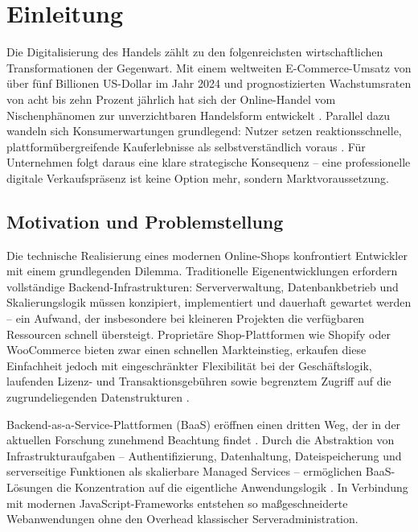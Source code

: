 \chapter{Einleitung}
\label{ch:einleitung}

Die Digitalisierung des Handels zählt zu den folgenreichsten wirtschaftlichen Transformationen der Gegenwart. Mit einem weltweiten E-Commerce-Umsatz von über fünf Billionen US-Dollar im Jahr 2024 und prognostizierten Wachstumsraten von acht bis zehn Prozent jährlich hat sich der Online-Handel vom Nischenphänomen zur unverzichtbaren Handelsform entwickelt \cite{heinemann2024, statista2025}. Parallel dazu wandeln sich Konsumerwartungen grundlegend: Nutzer setzen reaktionsschnelle, plattformübergreifende Kauferlebnisse als selbstverständlich voraus \cite{sagar2024}. Für Unternehmen folgt daraus eine klare strategische Konsequenz -- eine professionelle digitale Verkaufspräsenz ist keine Option mehr, sondern Marktvoraussetzung.

\section{Motivation und Problemstellung}
\label{sec:motivation}

Die technische Realisierung eines modernen Online-Shops konfrontiert Entwickler mit einem grundlegenden Dilemma. Traditionelle Eigenentwicklungen erfordern vollständige Backend-Infrastrukturen: Serververwaltung, Datenbankbetrieb und Skalierungslogik müssen konzipiert, implementiert und dauerhaft gewartet werden -- ein Aufwand, der insbesondere bei kleineren Projekten die verfügbaren Ressourcen schnell übersteigt. Proprietäre Shop-Plattformen wie Shopify oder WooCommerce bieten zwar einen schnellen Markteinstieg, erkaufen diese Einfachheit jedoch mit eingeschränkter Flexibilität bei der Geschäftslogik, laufenden Lizenz- und Transaktionsgebühren sowie begrenztem Zugriff auf die zugrundeliegenden Datenstrukturen \cite{heinemann2024}.

Backend-as-a-Service-Plattformen (BaaS) eröffnen einen dritten Weg, der in der aktuellen Forschung zunehmend Beachtung findet \cite{thatikonda2023}. Durch die Abstraktion von Infrastrukturaufgaben -- Authentifizierung, Datenhaltung, Dateispeicherung und serverseitige Funktionen als skalierbare Managed Services -- ermöglichen BaaS-Lösungen die Konzentration auf die eigentliche Anwendungslogik \cite{kolesnikov2024}. In Verbindung mit modernen JavaScript-Frameworks entstehen so maßgeschneiderte Webanwendungen ohne den Overhead klassischer Serveradministration.

